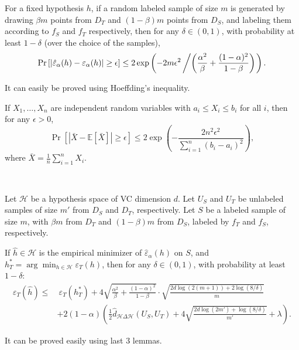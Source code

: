 \documentclass{article}
\begin{document}
\begin{lemma}[Lemma 5]
For a fixed hypothesis $h$, if a random labeled sample of size $m$ is generated by drawing $\beta m$ points from $D_T$ and $(1 - \beta)m$ points from $D_S$, and labeling them according to $f_S$ and $f_T$ respectively, then for any $\delta \in (0,1)$, with probability at least $1 - \delta$ (over the choice of the samples),
\[
\Pr\left[|\hat{\varepsilon}_\alpha(h) - \varepsilon_\alpha(h)| \geq \epsilon \right] \leq 2 \exp\left(-2m\epsilon^2 \left/ \left( \frac{\alpha^2}{\beta} + \frac{(1 - \alpha)^2}{1 - \beta} \right) \right.\right).
\]
\end{lemma}

It can easily be proved using Hoeffding’s inequality.

\begin{proposition}
If $X_1, \ldots, X_n$ are independent random variables with $a_i \leq X_i \leq b_i$ for all $i$, then for any $\epsilon > 0$,
\[
\Pr\left[|\bar{X} - \mathbb{E}[\bar{X}]| \geq \epsilon\right] \leq 2 \exp\left(-\frac{2n^2\epsilon^2}{\sum_{i=1}^n (b_i - a_i)^2} \right),
\]
where $\bar{X} = \frac{1}{n} \sum_{i=1}^n X_i$.
\end{proposition}
 \\

\begin{theorem}[Theorem 3]
Let $\mathcal{H}$ be a hypothesis space of VC dimension $d$. Let $U_S$ and $U_T$ be unlabeled samples of size $m'$ from $D_S$ and $D_T$, respectively. Let $S$ be a labeled sample of size $m$, with $\beta m$ from $D_T$ and $(1 - \beta)m$ from $D_S$, labeled by $f_T$ and $f_S$, respectively.

If $\hat{h} \in \mathcal{H}$ is the empirical minimizer of $\hat{\varepsilon}_\alpha(h)$ on $S$, and $h_T^* = \arg\min_{h \in \mathcal{H}} \varepsilon_T(h)$, then for any $\delta \in (0, 1)$, with probability at least $1 - \delta$:
\begin{align*}
\varepsilon_T(\hat{h}) \leq & \ \varepsilon_T(h_T^*) + 4 \sqrt{\frac{\alpha^2}{\beta} + \frac{(1 - \alpha)^2}{1 - \beta}} \cdot \sqrt{\frac{2d \log(2(m + 1)) + 2 \log(8 / \delta)}{m}} \\
& + 2(1 - \alpha) \left( \frac{1}{2} \hat{d}_{\mathcal{H} \Delta \mathcal{H}}(U_S, U_T) + 4 \sqrt{\frac{2d \log(2m') + \log(8 / \delta)}{m'}} + \lambda \right).
\end{align*}
\end{theorem}

It can be proved easily using last 3 lemmas.
\end{document}
